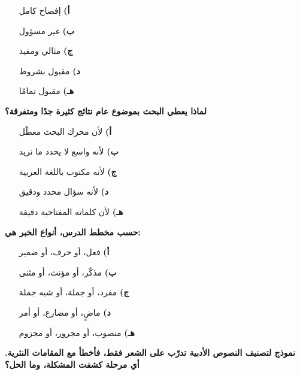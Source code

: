 \documentclass[11pt,a4paper]{article}
\begin{document}
\begin{multicols}{2}
\begin{minipage}{\linewidth}
\begin{itemize}[leftmargin=0.95cm, labelsep=4pt, itemsep=0pt, topsep=2pt, parsep=0pt]
  \item[\textbf{أ)}] إفصاح كامل
  \item[\textbf{ب)}] غير مسؤول
  \item[\textbf{ج)}] مثالي ومفيد
  \item[\textbf{د)}] مقبول بشروط
  \item[\textbf{هـ)}] مقبول تمامًا
\end{itemize}
\end{minipage}\par\vspace{7pt plus 4pt}
\noindent\begin{minipage}{\linewidth}
\hangindent=0.7cm\textbf{لماذا يعطي البحث بموضوع عام نتائج كثيرة جدًا ومتفرقة؟}
\begin{itemize}[leftmargin=0.95cm, labelsep=4pt, itemsep=0pt, topsep=2pt, parsep=0pt]
  \item[\textbf{أ)}] لأن محرك البحث معطّل
  \item[\textbf{ب)}] لأنه واسع لا يحدد ما نريد
  \item[\textbf{ج)}] لأنه مكتوب باللغة العربية
  \item[\textbf{د)}] لأنه سؤال محدد ودقيق
  \item[\textbf{هـ)}] لأن كلماته المفتاحية دقيقة
\end{itemize}
\end{minipage}\par\vspace{7pt plus 4pt}
\noindent\begin{minipage}{\linewidth}
\hangindent=0.7cm\textbf{حسب مخطط الدرس، أنواع الخبر هي:}
\begin{itemize}[leftmargin=0.95cm, labelsep=4pt, itemsep=0pt, topsep=2pt, parsep=0pt]
  \item[\textbf{أ)}] فعل، أو حرف، أو ضمير
  \item[\textbf{ب)}] مذكّر، أو مؤنث، أو مثنى
  \item[\textbf{ج)}] مفرد، أو جملة، أو شبه جملة
  \item[\textbf{د)}] ماضٍ، أو مضارع، أو أمر
  \item[\textbf{هـ)}] منصوب، أو مجرور، أو مجزوم
\end{itemize}
\end{minipage}\par\vspace{7pt plus 4pt}
\noindent\begin{minipage}{\linewidth}
\hangindent=0.7cm\textbf{نموذج لتصنيف النصوص الأدبية تدرّب على الشعر فقط، فأخطأ مع المقامات النثرية. أي مرحلة كشفت المشكلة، وما الحل؟}

\end{minipage}
\end{multicols}
\end{document}
